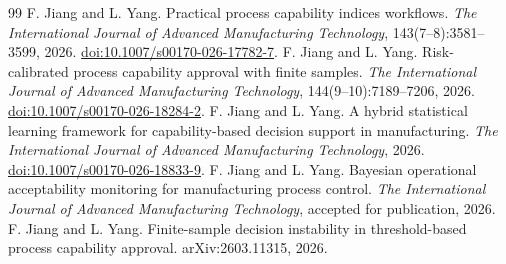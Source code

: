 \documentclass[a4paper,11pt,oneside,openany,parskip=half-,headings=standardclasses,toc=flat,numbers=noenddot]{scrbook}
\newcommand{\doi}[1]{\href{https://doi.org/#1}{doi:#1}}
\begin{document}
\begin{thebibliography}{99}
 F. Jiang and L. Yang. Practical process capability indices workflows.
  \emph{The International Journal of Advanced Manufacturing Technology}, 143(7--8):3581--3599, 2026.
  \doi{10.1007/s00170-026-17782-7}.
 F. Jiang and L. Yang. Risk-calibrated process capability approval with finite samples.
  \emph{The International Journal of Advanced Manufacturing Technology}, 144(9--10):7189--7206, 2026.
  \doi{10.1007/s00170-026-18284-2}.
 F. Jiang and L. Yang. A hybrid statistical learning framework for capability-based decision
  support in manufacturing. \emph{The International Journal of Advanced Manufacturing Technology},
  2026. \doi{10.1007/s00170-026-18833-9}.
 F. Jiang and L. Yang. Bayesian operational acceptability monitoring for manufacturing process
  control. \emph{The International Journal of Advanced Manufacturing Technology}, accepted for publication, 2026.
 F. Jiang and L. Yang. Finite-sample decision instability in threshold-based process
  capability approval. arXiv:2603.11315, 2026.


\end{thebibliography}
\end{document}
